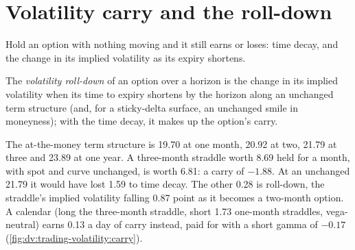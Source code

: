 \section{Volatility carry and the roll-down}

Hold an option with nothing moving and it still earns or loses: time decay, and the change in its implied volatility as its expiry shortens.

\begin{definition}\label{def:dv:trading-volatility:rolldown}
The \emph{volatility roll-down} of an option over a horizon is the change in its implied volatility when its time to
expiry shortens by the horizon along an unchanged term structure (and, for a sticky-delta surface, an unchanged smile in moneyness); with the
time decay, it makes up the option's carry.
\end{definition}

\begin{example}\label{ex:dv:trading-volatility:carry}
The at-the-money term structure is 19.70 at one month, 20.92 at two, 21.79 at three and 23.89 at one year. A three-month straddle worth 8.69
held for a month, with spot and curve unchanged, is worth 6.81: a carry of $-1.88$. At an unchanged 21.79 it would have lost 1.59 to time
decay. The other 0.28 is roll-down, the straddle's implied volatility falling 0.87 point as it becomes a two-month option. A calendar (long
the three-month straddle, short 1.73 one-month straddles, vega-neutral) earns 0.13 a day of carry instead, paid for with a short gamma of
$-0.17$ (\cref{fig:dv:trading-volatility:carry}).
\end{example}

